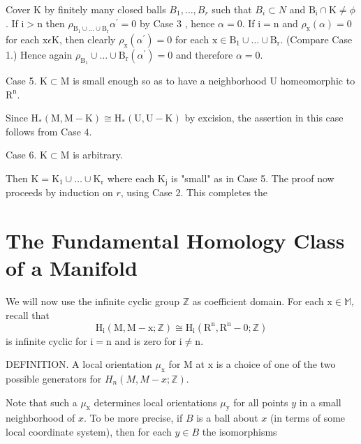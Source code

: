 \documentclass[10pt]{article}
\begin{document}
Cover $\mathrm{K}$ by finitely many closed balls $B_{1}, \ldots, B_{r}$ such that $B_{i} \subset N$ and $\mathrm{B}_{\mathrm{i}} \cap \mathrm{K} \neq \phi$. If $\mathrm{i}>\mathrm{n}$ then $\rho_{\mathrm{B}_{1} \cup \ldots \cup \mathrm{B}_{\mathrm{r}}} \alpha^{\prime}=0$ by Case 3 , hence $\alpha=0$. If $\mathrm{i}=\mathrm{n}$ and $\rho_{\mathrm{x}}(\alpha)=0$ for each $\mathrm{x} \epsilon \mathrm{K}$, then clearly $\rho_{\mathrm{x}}\left(\alpha^{\prime}\right)=0$ for each $\mathrm{x} \in \mathrm{B}_{1} \cup \ldots \cup \mathrm{B}_{\mathrm{r}}$. (Compare Case 1.) Hence again $\rho_{\mathrm{B}_{1}} \cup \ldots \cup \mathrm{B}_{\mathrm{r}}\left(\alpha^{\prime}\right)=0$ and therefore $\alpha=0$.

Case 5. $\mathrm{K} \subset \mathrm{M}$ is small enough so as to have a neighborhood U homeomorphic to $\mathrm{R}^{\mathrm{n}}$.

Since $\mathrm{H}_{*}(\mathrm{M}, \mathrm{M}-\mathrm{K}) \cong \mathrm{H}_{*}(\mathrm{U}, \mathrm{U}-\mathrm{K})$ by excision, the assertion in this case follows from Case $4 .$

Case 6. $\mathrm{K} \subset \mathrm{M}$ is arbitrary.

Then $\mathrm{K}=\mathrm{K}_{1} \cup \ldots \cup \mathrm{K}_{\mathrm{r}}$ where each $\mathrm{K}_{\mathrm{j}}$ is "small" as in Case 5. The proof now proceeds by induction on $r$, using Case 2. This completes the

\section{The Fundamental Homology Class of a Manifold}
We will now use the infinite cyclic group $\mathbb{Z}$ as coefficient domain. For each $\mathrm{x} \in \mathbb{M}$, recall that
$$
\mathrm{H}_{\mathrm{i}}(\mathrm{M}, \mathrm{M}-\mathrm{x} ; \mathbb{Z}) \cong \mathrm{H}_{\mathrm{i}}\left(\mathrm{R}^{\mathrm{n}}, \mathrm{R}^{\mathrm{n}}-0 ; \mathbb{Z}\right)
$$
is infinite cyclic for $\mathrm{i}=\mathrm{n}$ and is zero for $\mathrm{i} \neq \mathrm{n}$.

DEFINITION. A local orientation $\mu_{\mathrm{x}}$ for $\mathrm{M}$ at $\mathrm{x}$ is a choice of one of the two possible generators for $H_{n}(M, M-x ; \mathbb{Z})$.

Note that such a $\mu_{\mathrm{x}}$ determines local orientations $\mu_{\mathrm{y}}$ for all points $y$ in a small neighborhood of $x$. To be more precise, if $B$ is a ball about $x$ (in terms of some local coordinate system), then for each $y \in B$ the isomorphisms
\end{document}
